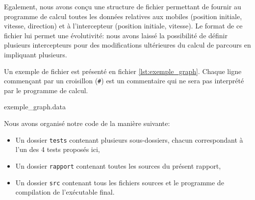 	Egalement, nous avons conçu une structure de fichier permettant de fournir au programme de calcul toutes les données relatives aux mobiles (position initiale, vitesse, direction) et à l'intercepteur (position initiale, vitesse). Le format de ce fichier lui permet une évolutivité: nous avons laissé la possibilité de définir plusieurs intercepteurs pour des modifications ultérieures du calcul de parcours en impliquant plusieurs.

	Un exemple de fichier est présenté en fichier \ref{lst:exemple_graph}. Chaque ligne commençant par un croisillon (\texttt{\#}) est un commentaire qui ne sera pas interprété par le programme de calcul.

	\begin{listing}[H]
      	\caption{exemple\_graph.data}
      	\label{lst:exemple_graph}
  	\end{listing}

  	Nous avons organisé notre code de la manière suivante:
  	\begin{itemize}
  		\item Un dossier \texttt{tests} contenant plusieurs sous-dossiers, chacun correspondant à l'un des 4 tests proposés ici,
  		\item Un dossier \texttt{rapport} contenant toutes les sources du présent rapport,
  		\item Un dossier \texttt{src} contenant tous les fichiers sources et le programme de compilation de l'exécutable final.
  	\end{itemize}